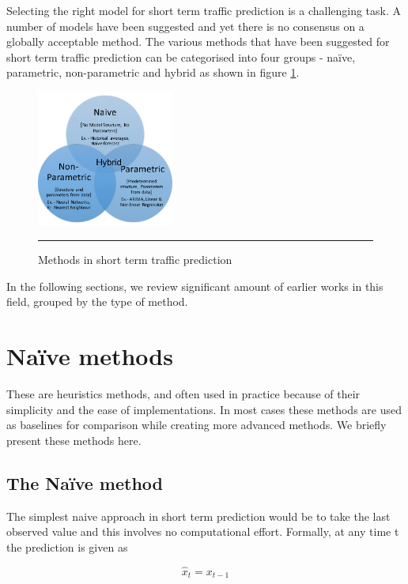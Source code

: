 Selecting the right model for short term traffic prediction is a challenging task. A number of
models have been suggested and yet there is no consensus on a globally acceptable method.
The various methods that have been suggested for short term traffic prediction can be categorised into four
groups - naïve, parametric, non-parametric and hybrid as shown in figure \ref{fig:sttp-methods}.

\begin{figure}[htbp]
  \centering
    \includegraphics[width=0.4\textwidth,height=0.4\textheight,keepaspectratio]{Figures/sttp-methods.pdf}
    \rule{35em}{0.5pt}
  \caption[Methods in short term traffic prediction]{Methods in short term traffic prediction}
  \label{fig:sttp-methods}
\end{figure}

In the following sections, we review significant amount of earlier works in this field, grouped by the
type of method.

\section{Naïve methods}
These are heuristics methods, and often used in practice because of their simplicity and the ease
of implementations. In most cases these methods are used as baselines for comparison while
creating more advanced methods. We briefly present these methods here.

\subsection{The Naïve method}
The simplest naive approach in short term prediction would be to take the last observed value and
this involves no computational effort. Formally, at any time t the prediction is given as

        \begin{equation}
            \hat{x}_{t} = x_{t-1}
        \end{equation}

